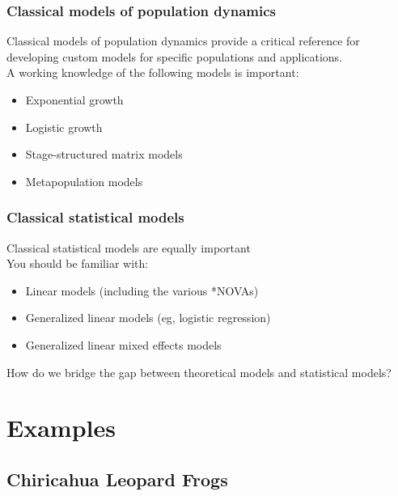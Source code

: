 \documentclass[color=usenames,dvipsnames,handout]{beamer}\usepackage[]{graphicx}\usepackage[]{color}
\begin{document}
\begin{frame}
  \frametitle{Classical models of population dynamics}
  Classical models of population dynamics provide a critical reference
  for developing custom models for specific populations and
  applications. \\
  \pause
  \vfill
  A working knowledge of the following models is important:
  \begin{itemize}
    \item Exponential growth
    \item Logistic growth
    \item Stage-structured matrix models
    \item Metapopulation models
  \end{itemize}
\end{frame}


\begin{frame}
  \frametitle{Classical statistical models}
  Classical statistical models are equally important \\
  \pause
  \vfill
  You should be familiar with:
  \begin{itemize}
    \item Linear models (including the various *NOVAs)
    \item Generalized linear models (eg, logistic regression)
    \item Generalized linear mixed effects models
  \end{itemize}
\end{frame}



\begin{frame}
  \LARGE %
  \centering
  How do we bridge the gap between theoretical models and statistical 
  models?  \\
\end{frame}


\section{Examples}


\subsection{Chiricahua Leopard Frogs}
\end{document}
